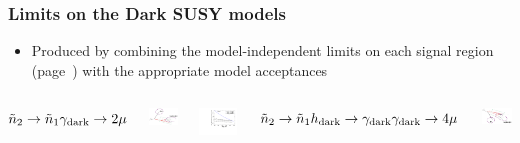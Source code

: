 \documentclass[compress]{beamer}
\newcommand{\s}[1]{{\mbox{\scriptsize #1}}}
\begin{document}
\begin{frame}
\frametitle{Limits on the Dark SUSY models}

\begin{itemize}
\item Produced by combining the model-independent limits on each
  signal region (page~\pageref{page:limits}) with the appropriate
  model acceptances
\end{itemize}

\begin{columns}
\centering \mbox{$\tilde{n}_2 \to \tilde{n}_1 \gamma_\s{dark} \to 2\mu$}

\includegraphics[width=0.7\linewidth]{diagram_squark_2mu.png}

\includegraphics[width=\linewidth]{ulimit_model0.pdf}

\centering \mbox{$\tilde{n}_2 \to \tilde{n}_1 h_\s{dark} \to \gamma_\s{dark}\gamma_\s{dark} \to 4\mu$}

\includegraphics[width=0.7\linewidth]{diagram_squark_4mu.png}


\end{columns}
\end{frame}
\end{document}
